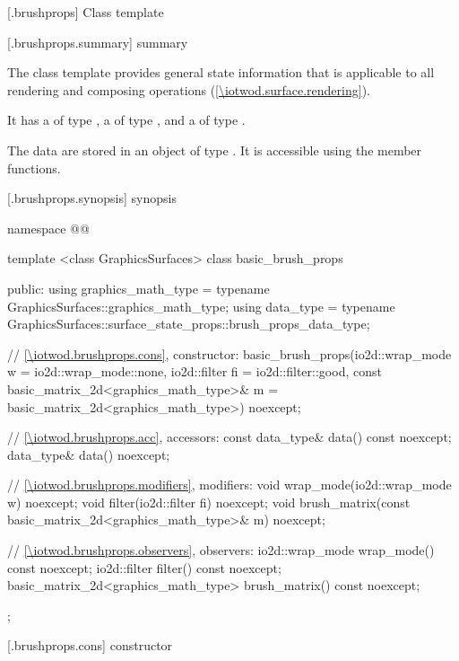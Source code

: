 
 [\iotwod.brushprops] {Class template }

 [\iotwod.brushprops.summary] { summary}

\pnum
{}%
The  class template provides general state information that is applicable to all rendering and composing operations (\ref{\iotwod.surface.rendering}).

\pnum
It has a  of type , a  of type , and a  of type .

\pnum
The data are stored in an object of type . It is accessible using the  member functions.

 [\iotwod.brushprops.synopsis] { synopsis}

\begin{codeblock}
namespace @\fullnamespace{}@ {
  template <class GraphicsSurfaces>
  class basic_brush_props {
    public:
    using graphics_math_type = typename GraphicsSurfaces::graphics_math_type;
    using data_type =
      typename GraphicsSurfaces::surface_state_props::brush_props_data_type;

    // \ref{\iotwod.brushprops.cons}, constructor:
    basic_brush_props(io2d::wrap_mode w = io2d::wrap_mode::none,
      io2d::filter fi = io2d::filter::good,
      const basic_matrix_2d<graphics_math_type>& m = basic_matrix_2d<graphics_math_type>{})
      noexcept;

    // \ref{\iotwod.brushprops.acc}, accessors:
    const data_type& data() const noexcept;
    data_type& data() noexcept;

    // \ref{\iotwod.brushprops.modifiers}, modifiers:
    void wrap_mode(io2d::wrap_mode w) noexcept;
    void filter(io2d::filter fi) noexcept;
    void brush_matrix(const basic_matrix_2d<graphics_math_type>& m) noexcept;

    // \ref{\iotwod.brushprops.observers}, observers:
    io2d::wrap_mode wrap_mode() const noexcept;
    io2d::filter filter() const noexcept;
    basic_matrix_2d<graphics_math_type> brush_matrix() const noexcept;
  };
}
\end{codeblock}

 [\iotwod.brushprops.cons] { constructor}

